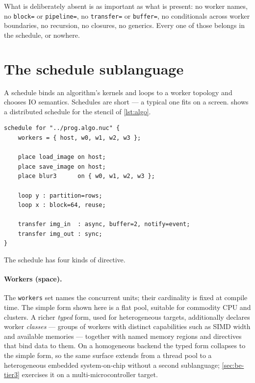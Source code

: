 What is deliberately absent is as important as what is present: no worker names,
no \texttt{block=} or \texttt{pipeline=}, no \texttt{transfer=} or
\texttt{buffer=}, no conditionals across worker boundaries, no recursion, no
closures, no generics. Every one of those belongs in the schedule, or nowhere.

\section{The schedule sublanguage}\label{sec:lang-schedule}

A schedule binds an algorithm's kernels and loops to a worker topology and
chooses IO semantics. Schedules are short --- a typical one fits on a screen.
 shows a distributed schedule for the stencil of
\cref{lst:algo}.

\begin{lstlisting}[language=Nuc,caption={A distributed schedule for the stencil. Decomposition, loop transforms, and IO semantics are all here; none of it appears in the algorithm.},label={lst:sched}]
schedule for "../prog.algo.nuc" {
    workers = { host, w0, w1, w2, w3 };

    place load_image on host;
    place save_image on host;
    place blur3      on { w0, w1, w2, w3 };

    loop y : partition=rows;
    loop x : block=64, reuse;

    transfer img_in  : async, buffer=2, notify=event;
    transfer img_out : sync;
}
\end{lstlisting}

The schedule has four kinds of directive.

\paragraph{Workers (space).} The \texttt{workers} set names the concurrent units;
their cardinality is fixed at compile time. The simple form shown here is a flat
pool, suitable for commodity CPU and clusters. A richer \emph{typed} form, used
for heterogeneous targets, additionally declares worker \emph{classes} --- groups
of workers with distinct capabilities such as SIMD width and available memories
--- together with named memory regions and directives that bind data to them. On a
homogeneous backend the typed form collapses to the simple form, so the same
surface extends from a thread pool to a heterogeneous embedded system-on-chip
without a second sublanguage; \cref{sec:be-tier3} exercises it on a
multi-microcontroller target.

